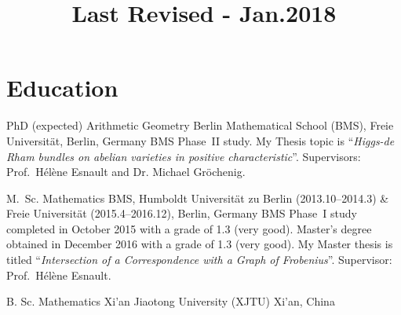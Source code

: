 \documentclass[10pt,a4paper,roman]{moderncv}
\title{\normalsize Last Revised - Jan.2018}
\begin{document}
\maketitle





\section{Education}
%
{PhD (expected)}%
{Arithmetic Geometry}%
{Berlin Mathematical School (BMS), Freie Universität, Berlin, Germany}%
{}%
{
    BMS Phase~II study. My Thesis topic is
    ``\emph{Higgs-de Rham bundles on abelian varieties
    in positive characteristic}''.
    Supervisors: Prof.\ Hélène Esnault and Dr. Michael Gröchenig.
}

{M.\ Sc.}%
{Mathematics}%
{%
    BMS, Humboldt Universität zu Berlin (2013.10--2014.3) \&
    Freie Universität (2015.4--2016.12), Berlin, Germany
}%
{}%
{%
    BMS Phase~I study completed in October 2015 with a grade of 1.3 (very good).
    Master's degree obtained in December 2016 with a grade of 1.3 (very good).
    My Master thesis is titled
    ``\emph{Intersection of a Correspondence with a Graph of Frobenius}''.
    Supervisor: Prof.\ Hélène Esnault.
}

%
{B. Sc.}%
{Mathematics}%
{Xi'an Jiaotong University (XJTU)}%
{Xi'an, China}{}%
\end{document}
